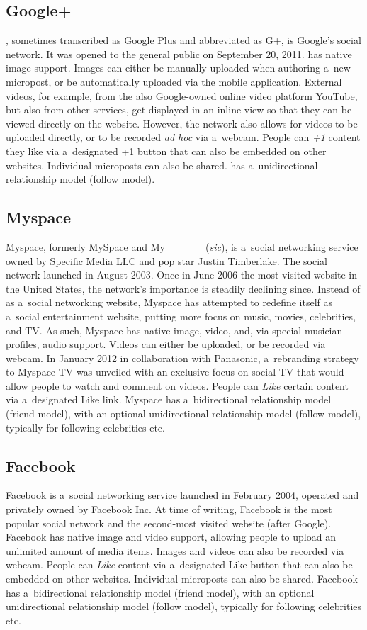\subsection{Google+}

\googleplus, sometimes transcribed as Google Plus
and abbreviated as G+, is Google's social network.
It was opened to the general public on September 20, 2011.
\googleplus has native image support.
Images can either be manually uploaded
when authoring a~new micropost,
or be automatically uploaded via the \googleplus
mobile application.
External videos, for example, from
the also Google-owned online video platform YouTube,
but also from other services,
get displayed in an inline view
so that they can be viewed directly on the website.
However, the network also allows for
videos to be uploaded directly,
or to be recorded \emph{ad hoc} via a~webcam.
People can \emph{+1} content they like via a~designated +1 button
that can also be embedded on other websites.
Individual microposts can also be shared.
\googleplus has a~unidirectional relationship model
(follow model).

\subsection{Myspace}
Myspace, formerly MySpace and My\_\_\_\_\_ (\emph{sic}), is a~social networking service owned by Specific Media LLC and pop star Justin Timberlake.
The social network launched in August 2003.
Once in June 2006 the most visited website in the United States, the network's importance
is steadily declining since.
Instead of as a~social networking website,
Myspace has attempted to redefine itself as a~social entertainment website,
putting more focus on music, movies, celebrities, and TV.
As such, Myspace has native image, video, and, via special musician profiles, audio support.
Videos can either be uploaded, or be recorded via webcam.
In January 2012 in collaboration with Panasonic, a~rebranding strategy to Myspace TV was unveiled
with an exclusive focus on social TV that would allow people  to watch and comment on videos.
People can \emph{Like} certain content via a~designated Like link.
Myspace has a~bidirectional relationship model (friend model),
with an optional unidirectional relationship model (follow model),
typically for following celebrities etc.

\subsection{Facebook}
Facebook is a~social networking service launched in February 2004,
operated and privately owned by Facebook Inc.
At time of writing, Facebook is the most popular social network
and the second-most visited website (after Google).
Facebook has native image and video support,
allowing people to upload an unlimited amount of media items.
Images and videos can also be recorded via webcam.
People can \emph{Like} content via a~designated Like button
that can also be embedded on other websites.
Individual microposts can also be shared.
Facebook has a~bidirectional relationship model (friend model),
with an optional unidirectional relationship model (follow model),
typically for following celebrities etc.


